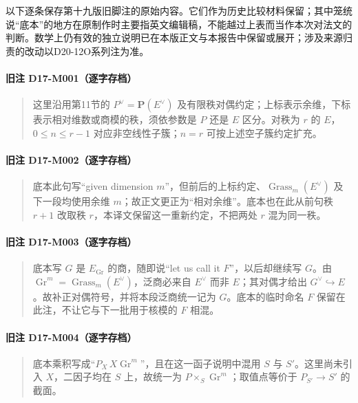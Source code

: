 \documentclass[UTF8,a4paper]{ctexbook}
\begin{document}
以下逐条保存第十九版旧脚注的原始内容。它们作为历史比较材料保留；其中笼统说“底本”的地方在原制作时主要指英文编辑稿，不能越过上表而当作本次对法文的判断。数学上仍有效的独立说明已在本版正文与本报告中保留或展开；涉及来源归责的改动以D20-12O系列注为准。

\paragraph*{旧注 D17-M001（逐字存档）}
\begin{quote}
这里沿用第11节的 $P^\vee=\mathbf P(E^\vee)$ 及有限秩对偶约定；上标表示余维，下标表示相对维数或商模的秩，须依参数是 $P$ 还是 $E$ 区分。对秩为 $r$ 的 $E$，$0\leq n\leq r-1$ 对应非空线性子簇；$n=r$ 可按上述空子簇约定扩充。
\end{quote}

\paragraph*{旧注 D17-M002（逐字存档）}
\begin{quote}
底本此句写“given dimension $m$”，但前后的上标约定、$\operatorname{Grass}_m(E^\vee)$ 及下一段均使用余维 $m$；故正文更正为“相对余维”。底本也在此从前句秩 $r+1$ 改取秩 $r$，本译文保留这一重新约定，不把两处 $r$ 混为同一秩。
\end{quote}

\paragraph*{旧注 D17-M003（逐字存档）}
\begin{quote}
底本写 $G$ 是 $E_{\operatorname{Gr}}$ 的商，随即说“let us call it $F$”，以后却继续写 $G$。由 $\operatorname{Gr}^m=\operatorname{Grass}_m(E^\vee)$，泛商必来自 $E^\vee$ 而非 $E$；其对偶才给出 $G^\vee\hookrightarrow E$。故补正对偶符号，并将本段泛商统一记为 $G$。底本的临时命名 $F$ 保留在此注，不让它与下一批用于核模的 $F$ 相混。
\end{quote}

\paragraph*{旧注 D17-M004（逐字存档）}
\begin{quote}
底本乘积写成“$P_X\,X\operatorname{Gr}^m$”，且在这一函子说明中混用 $S$ 与 $S'$。这里尚未引入 $X$，二因子均在 $S$ 上，故统一为 $P\times_S\operatorname{Gr}^m$；取值点等价于 $P_{S'}\to S'$ 的截面。
\end{quote}
\end{document}
